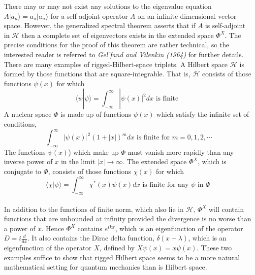 \noindent
There may or may not exist any solutions to the eigenvalue equation $A|a_n\rangle = a_n |a_n\rangle$ for a self-adjoint operator $A$ on an infinite-dimensional vector space. However, the generalized spectral theorem asserts that if $A$ is self-adjoint in $\mathcal{H}$ then a complete set of eigenvectors exists in the extended space $\Phi^X$. The precise conditions for the proof of this theorem are rather technical, so the interested reader is referred to \emph{Gel'fand and Vilenkin (1964)} for further details.
\\
There are many examples of rigged-Hilbert-space triplets. A Hilbert space $\mathcal{H}$ is formed by those functions that are square-integrable. That is, $\mathcal{H}$ consists of those functions $\psi(x)$ for which
\[\langle \psi | \psi \rangle = \int_{-\infty}^{\infty} |\psi(x)|^2 dx \mbox{ is finite }\]
A nuclear space $\Phi$ is made up of functions $\psi(x)$ which satisfy the infinite set of conditions,
\[\ \int_{-\infty}^{\infty} |\psi(x)|^2(1+|x|)^m dx \mbox{ is finite for } m = 0,1,2,\cdots\]
The functions $\psi(x)$) which make up $\Phi$ must vanish more rapidly than any inverse power of $x$ in the limit $|x| \to \infty$. The extended space $\Phi^X$, which is conjugate to $\Phi$, consists of those functions $\chi(x)$ for which
\[\langle \chi | \psi \rangle = \int_{-\infty}^{\infty} \chi^*(x)\psi(x) dx \mbox{ is finite for any } \psi \mbox{ in } \Phi\]
\\
In addition to the functions of finite norm, which also lie in $\mathcal{H}$, $\Phi^X$ will contain functions that are unbounded at infinity provided the divergence is no worse than a power of $x$. Hence $\Phi^X$ contains $e^{ikx}$, which is an eigenfunction
of the operator $D = i \frac{d}{dx}$. It also contains the Dirac delta function, $\delta(x-\lambda)$, which is an eigenfunction of the operator $X$, defined by $X\psi(x) = x\psi(x)$.
These two examples suffice to show that rigged Hilbert space seems to be a more natural mathematical setting for quantum mechanics than is Hilbert space.

